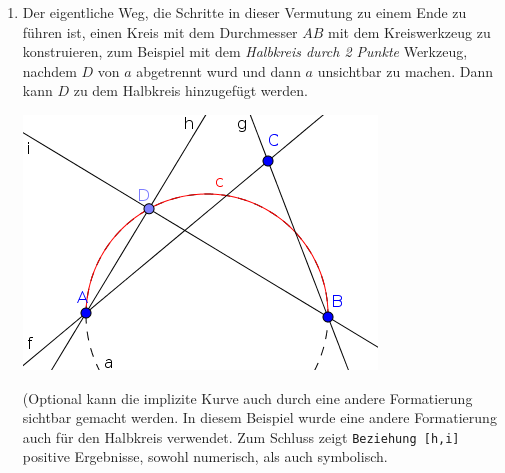 \documentclass{article}
\begin{document}
\begin{enumerate}
\begin{enumerate}
      \item Der eigentliche Weg, die Schritte in dieser Vermutung zu einem Ende zu führen ist,  einen Kreis mit dem Durchmesser $AB$ mit dem Kreiswerkzeug zu konstruieren, zum Beispiel mit dem \textit{Halbkreis durch 2 Punkte} Werkzeug, nachdem $D$ von $a$ abgetrennt wurd und dann $a$ unsichtbar zu machen. Dann kann $D$ zu dem Halbkreis hinzugefügt werden.
\begin{center}
\includegraphics[scale=0.5]{limitations-Thales1-3}
\end{center}
      (Optional kann die implizite Kurve auch durch eine andere Formatierung sichtbar gemacht werden. In diesem Beispiel wurde eine andere Formatierung auch für den Halbkreis verwendet. Zum Schluss zeigt \texttt{Beziehung [h,i]} positive Ergebnisse, sowohl numerisch, als auch symbolisch.
    \end{enumerate}
\end{enumerate}
\end{document}
